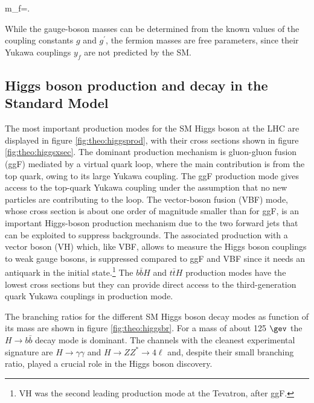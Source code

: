 \be
m_{f}=.
\ee

\noindent While the gauge-boson masses can be determined from the known values of the coupling constants $g$ and $g^{\prime}$, the fermion masses are free parameters, since their Yukawa couplings $y_{f}$ are not predicted by the SM. 


\subsection{Higgs boson production and decay in the Standard Model}

The most important production modes for the SM Higgs boson at the LHC are displayed in figure \ref{fig:theo:higgsprod}, with their cross sections shown in figure \ref{fig:theo:higgsxsec}.
The dominant production mechanism is gluon-gluon fusion (ggF) mediated by a virtual quark loop, where the main contribution is from the top quark, owing to its large Yukawa coupling.
The ggF production mode gives access to the top-quark Yukawa coupling under the assumption that no new particles are contributing to the loop. The vector-boson fusion (VBF) mode, whose cross section is about one order of magnitude smaller than for ggF, is an important Higgs-boson production mechanism due to the two forward jets that can be exploited to suppress backgrounds.
The associated production with a vector boson (VH) which, like VBF, allows to measure the Higgs boson couplings to weak gauge bosons, is suppressed compared to ggF and VBF since it needs an antiquark in the initial state.\footnote{VH was the second leading production mode at the Tevatron, after ggF.} The $b\bar{b}H$ and $t\bar{t}H$ production modes have the lowest cross sections but they can provide direct access to the third-generation quark Yukawa couplings in production mode.\par
The branching ratios for the different SM Higgs boson decay modes \cite{lhcxs} as function of its mass are shown in figure \ref{fig:theo:higgsbr}. For a mass of about 125 $\gev$ the $H \to b\bar{b}$ decay mode is dominant. The channels with the cleanest experimental signature are $H \to \gamma\gamma$ and $H\to ZZ^* \to 4\ell$ and, despite their small branching ratio, played a crucial role in the Higgs boson discovery.  

